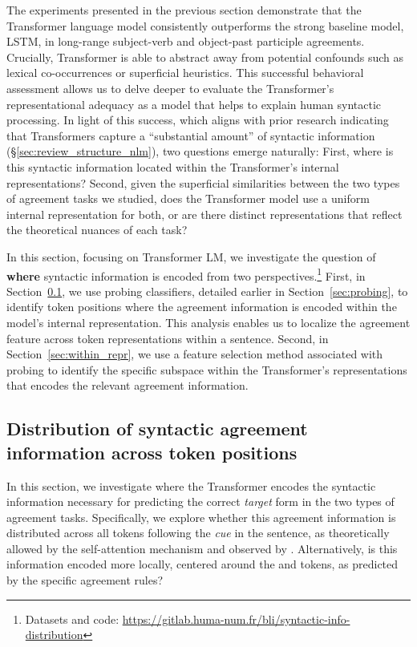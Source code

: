 The experiments presented in the previous section demonstrate that the Transformer language model consistently outperforms the strong baseline model, LSTM, in long-range subject-verb and object-past participle agreements. Crucially, Transformer is able to abstract away from potential confounds such as lexical co-occurrences or superficial heuristics. This successful behavioral assessment allows us to delve deeper to evaluate the Transformer's representational adequacy as a model that helps to explain human syntactic processing.
In light of this success, which aligns with prior research indicating that Transformers capture a “substantial amount” of syntactic information (\S\ref{sec:review_structure_nlm}), two questions emerge naturally: First, where is this syntactic information located within the Transformer's internal representations? Second, given the superficial similarities between the two types of agreement tasks we studied, does the Transformer model use a uniform internal representation for both, or are there distinct representations that reflect the theoretical nuances of each task?


In this section, focusing on Transformer LM, we investigate the question of \textbf{where} syntactic information is encoded from two perspectives.\footnote{Datasets and code: \url{https://gitlab.huma-num.fr/bli/syntactic-info-distribution}} First, in Section~\ref{sec:within_sentences}, we use probing classifiers, detailed earlier in Section~\ref{sec:probing}, to identify token positions where the agreement information is encoded within the model's internal representation. 
This analysis enables us to localize the agreement feature across token representations within a sentence. Second, in Section~\ref{sec:within_repr}, we use a feature selection method associated with probing to identify the specific subspace within the Transformer's representations that encodes the relevant agreement information.
 

\subsection{Distribution of syntactic agreement information across token positions}\label{sec:within_sentences}
In this section, we investigate where the Transformer encodes the syntactic information necessary for predicting the correct \emph{target} form in the two types of agreement tasks. Specifically, we explore whether this agreement information is distributed across all tokens following the \emph{cue} in the sentence, as theoretically allowed by the self-attention mechanism and observed by \cite{klafka-ettinger-2020-spying}. Alternatively, is this information encoded more locally, centered around the \cue and \target tokens, as predicted by the specific agreement rules?

